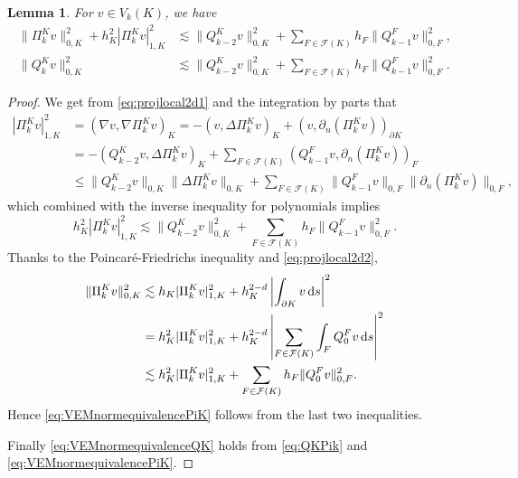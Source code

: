 \documentclass[10pt]{amsart}
\newtheorem{lemma}[theorem]{Lemma}
\numberwithin{equation}{section}
\begin{document}
\begin{lemma}
For $v\in V_k(K)$, we have
\begin{align}
\|\Pi_k^Kv\|_{0,K}^2+h_K^2|\Pi_k^Kv|_{1,K}^2&\lesssim \|Q_{k-2}^Kv\|_{0,K}^2+\sum_{F\in\mathcal F(K)}h_F\|Q_{k-1}^Fv\|_{0,F}^2, \label{eq:VEMnormequivalencePiK}\\
\|Q_k^Kv\|_{0,K}^2&\lesssim \|Q_{k-2}^Kv\|_{0,K}^2+\sum_{F\in\mathcal F(K)}h_F\|Q_{k-1}^Fv\|_{0,F}^2. \label{eq:VEMnormequivalenceQK}
\end{align}
\end{lemma}
\begin{proof}
We get from \eqref{eq:projlocal2d1} and the integration by parts that
\begin{align*}
|\Pi_k^Kv|_{1,K}^2&=(\nabla v, \nabla\Pi_k^Kv)_K=-(v, \Delta\Pi_k^Kv)_K+(v, \partial_n(\Pi_k^Kv))_{\partial K} \\
&=-(Q_{k-2}^Kv, \Delta\Pi_k^Kv)_K+\sum_{F\in\mathcal F(K)}(Q_{k-1}^Fv, \partial_n(\Pi_k^Kv))_{F} \\
&\leq\|Q_{k-2}^Kv\|_{0,K}\|\Delta\Pi_k^Kv\|_{0,K}+\sum_{F\in\mathcal F(K)}\|Q_{k-1}^Fv\|_{0,F}\|\partial_n(\Pi_k^Kv)\|_{0,F},
\end{align*}
which combined with the inverse inequality for polynomials implies
$$%
h_K^2|\Pi_k^Kv|_{1,K}^2\lesssim \|Q_{k-2}^Kv\|_{0,K}^2+\sum_{F\in\mathcal F(K)}h_F\|Q_{k-1}^Fv\|_{0,F}^2. 
$$
Thanks to the Poincar\'e-Friedrichs inequality \cite[(2.15)]{BrennerSung2018} and \eqref{eq:projlocal2d2},
\begin{align*}  
\|\Pi_k^Kv\|_{0,K}^2&\lesssim h_K|\Pi_k^Kv|_{1,K}^2+h_K^{2-d}\left|\int_{\partial K}v\,{\rm d}s\right|^2 \\
&=h_K^2|\Pi_k^Kv|_{1,K}^2+h_K^{2-d}\left|\sum_{F\in\mathcal F(K)}\int_{F}Q_{0}^Fv\,{\rm d}s\right|^2 \\
&\lesssim h_K^2|\Pi_k^Kv|_{1,K}^2+\sum_{F\in\mathcal F(K)}h_F\|Q_{0}^Fv\|_{0,F}^2.
\end{align*}
Hence \eqref{eq:VEMnormequivalencePiK} follows from the last two inequalities.

Finally \eqref{eq:VEMnormequivalenceQK} holds from \eqref{eq:QKPik} and \eqref{eq:VEMnormequivalencePiK}.
\end{proof}
\end{document}
